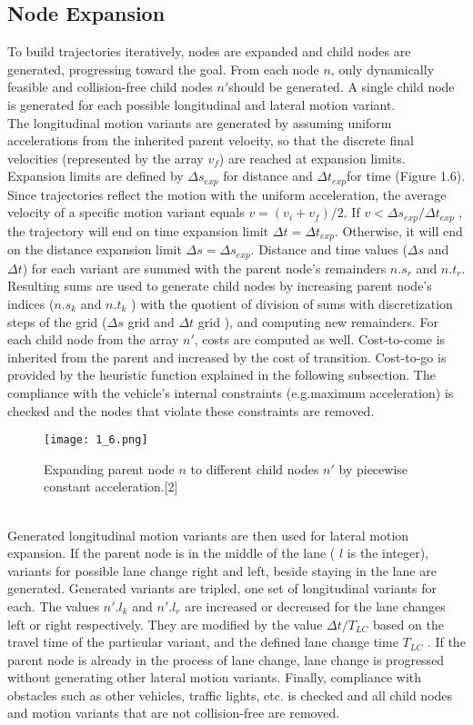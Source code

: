 \documentclass{thesisreport}
\begin{document}
\subsection{Node Expansion}
To build trajectories iteratively, nodes are expanded and child nodes are generated, progressing toward the goal. From each node $n$, only dynamically feasible and collision-free child nodes $n'$should be generated. A single child node is generated for each possible longitudinal and lateral motion variant.\\
\indent
The longitudinal motion variants are generated by assuming uniform accelerations from the inherited parent velocity, so that the discrete final velocities (represented by the array $v_f$) are reached at expansion limits. Expansion limits are defined by $ \Delta s_{exp}$ for distance and $\Delta t_{exp} $for time (Figure 1.6). Since trajectories reflect the motion with the uniform acceleration, the average velocity of a specific motion variant equals $v = (v_i + v_f ) /2$. If $v < \Delta s_{exp} /\Delta t_{exp}$ , the trajectory will end on time expansion limit $\Delta t = \Delta t_{exp}$. Otherwise,
it will end on the distance expansion limit $\Delta s = \Delta s_{exp}$. Distance and time values ($\Delta s$ and $\Delta t$) for each variant are summed with the parent node’s remainders $n.s_r$ and $n.t_r$. Resulting sums are used to generate child nodes by increasing parent node’s indices ($n.s_k$ and $n.t_k$ ) with the quotient of division of sums with discretization steps of the grid ($\Delta s$ grid and $\Delta t$ grid ), and computing new remainders. For each child node from the array $n'$, costs are computed as well. Cost-to-come is inherited from the parent and increased by the cost of transition. Cost-to-go is provided by the heuristic function explained in the following subsection. The compliance with the vehicle’s internal constraints (e.g.maximum acceleration) is checked and the nodes that violate these constraints are removed.
   \begin{figure}[ht]
	\centering
	\texttt{[image: 1\_6.png]}
	\caption{Expanding parent node $n$ to different child nodes $n'$ by piecewise constant acceleration.[2]}
	\label{fig:1.6} 
\end{figure}\\
\indent
Generated longitudinal motion variants are then used for lateral motion expansion. If the parent node is in the middle of the lane ( $l$ is the integer), variants for possible lane change right and left, beside staying in the lane are generated. Generated variants are tripled, one set of longitudinal variants for each. The values $n'.l_k$ and $n'.l_r$ are increased or decreased for the lane changes left or right respectively. They are modified by the value $\Delta t/T_{LC}$ based on the travel time of the particular variant, and the defined lane change time $T_{LC}$ . If the parent node is already in the process of lane change, lane change is progressed without generating other lateral motion variants. Finally, compliance with obstacles such as other vehicles, traffic lights, etc. is checked and all child nodes and motion variants that are not collision-free are removed.
\end{document}
